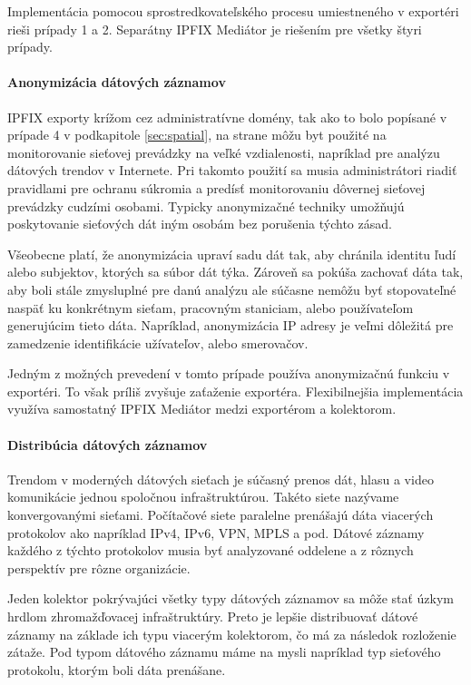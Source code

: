 Implementácia pomocou sprostredkovateľského procesu umiestneného v exportéri rieši prípady 1 a 2. 
Separátny IPFIX Mediátor je riešením pre  všetky štyri prípady.


\paragraph{Anonymizácia dátových záznamov}

IPFIX exporty krížom cez administratívne domény, tak ako to bolo popísané v prípade 4 
v podkapitole \ref{sec:spatial}, na strane \pageref{sec:spatial} môžu 
byt použité na monitorovanie sieťovej prevádzky na veľké vzdialenosti, 
napríklad pre analýzu dátových trendov v Internete. Pri takomto použití sa musia administrátori riadiť
pravidlami pre ochranu súkromia a predísť monitorovaniu dôvernej sieťovej prevádzky cudzími osobami.
Typicky anonymizačné techniky umožňujú poskytovanie sieťových dát iným osobám bez porušenia týchto zásad.

Všeobecne platí, že anonymizácia upraví sadu dát tak, aby chránila identitu ľudí alebo subjektov, 
ktorých sa súbor dát týka. Zároveň sa pokúša zachovať dáta tak, aby boli stále zmysluplné pre danú 
analýzu ale súčasne nemôžu byť stopovateľné naspäť ku konkrétnym sieťam, pracovným staniciam, alebo 
používateľom generujúcim tieto dáta. Napríklad, anonymizácia IP adresy je veľmi dôležitá pre 
zamedzenie identifikácie užívateľov, alebo smerovačov. 

Jedným z možných prevedení v tomto prípade používa anonymizačnú funkciu v exportéri. 
To však príliš zvyšuje zaťaženie exportéra. Flexibilnejšia implementácia využíva samostatný 
IPFIX Mediátor medzi exportérom a kolektorom.


\paragraph{Distribúcia dátových záznamov}

Trendom v moderných dátových sieťach je súčasný prenos dát, hlasu a video komunikácie jednou 
spoločnou infraštruktúrou. Takéto siete nazývame konvergovanými sieťami. 
Počítačové siete paralelne prenášajú dáta viacerých protokolov ako napríklad
IPv4, IPv6, VPN, MPLS a pod. Dátové záznamy každého z týchto protokolov musia byť analyzované 
oddelene a z rôznych perspektív pre rôzne organizácie.

Jeden kolektor pokrývajúci všetky typy dátových záznamov sa môže stať úzkym hrdlom 
zhromažďovacej infraštruktúry. Preto je lepšie distribuovať dátové záznamy na základe ich 
typu viacerým kolektorom, čo má za následok rozloženie zátaže. Pod typom dátového 
záznamu máme na mysli napríklad typ sieťového protokolu, ktorým boli dáta prenášane. 

